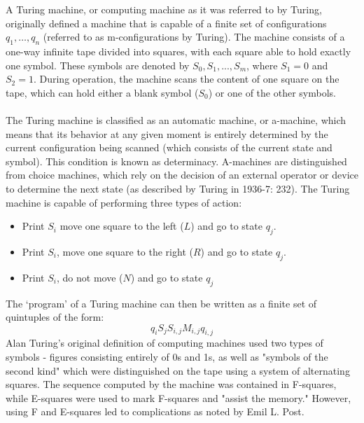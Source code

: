 \documentclass[10pt,a4paper]{article}
\begin{document}
                A Turing machine, or computing machine as it was referred to by Turing, originally defined a machine that is capable of a finite set of configurations $q_1,\dots,q_n$ (referred to as m-configurations by Turing). The machine consists of a one-way infinite tape divided into squares, with each square able to hold exactly one symbol. These symbols are denoted by $S_0, S_1, ..., S_m$, where $S_1 = 0$ and $S_2 = 1$. During operation, the machine scans the content of one square on the tape, which can hold either a blank symbol ($S_0$) or one of the other symbols.
                \\
                \\
                The Turing machine is classified as an automatic machine, or a-machine, which means that its behavior at any given moment is entirely determined by the current configuration being scanned (which consists of the current state and symbol). This condition is known as determinacy. A-machines are distinguished from choice machines, which rely on the decision of an external operator or device to determine the next state (as described by Turing in 1936-7: 232). The Turing machine is capable of performing three types of action:
                \begin{itemize}
                    \item Print $S_i$ move one square to the left ($L$) and go to state $q_j$.
                    \item Print $S_i$, move one square to the right ($R$) and go to state $q_j$.
                    \item Print $S_i$, do not move ($N$) and go to state $q_j$
                \end{itemize}
                The ‘program’ of a Turing machine can then be written as a finite set of quintuples of the form:
                \begin{equation}
                    q_i S_jS_{i,j}M_{i,j}q_{i,j}
                \end{equation}
                Alan Turing's original definition of computing machines used two types of symbols - figures consisting entirely of 0s and 1s, as well as "symbols of the second kind" which were distinguished on the tape using a system of alternating squares. The sequence computed by the machine was contained in F-squares, while E-squares were used to mark F-squares and "assist the memory." However, using F and E-squares led to complications as noted by Emil L. Post.
                \\
\end{document}
